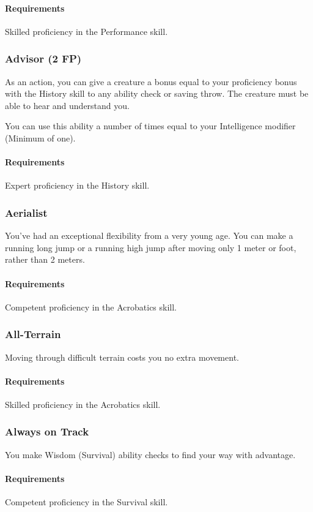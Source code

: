     \paragraph{Requirements} Skilled proficiency in the Performance skill.
\subsubsection{Advisor (2 FP)} \label{feat::advisor}
    As an action, you can give a creature a bonus equal to your proficiency bonus with the History skill to any ability check or saving throw.
    The creature must be able to hear and understand you.

    You can use this ability a number of times equal to your Intelligence modifier (Minimum of one).
    \paragraph{Requirements} Expert proficiency in the History skill.
\subsubsection{Aerialist} \label{feat::aerialist}
    You've had an exceptional flexibility from a very young age.
    You can make a running long jump or a running high jump after moving only 1 meter or foot, rather than 2 meters.
    \paragraph{Requirements} Competent proficiency in the Acrobatics skill.
\subsubsection{All-Terrain} \label{feat::allterrain}
    Moving through difficult terrain costs you no extra movement.
    \paragraph{Requirements} Skilled proficiency in the Acrobatics skill.
\subsubsection{Always on Track} \label{feat::alwaysontrack}
    You make Wisdom (Survival) ability checks to find your way with advantage.
    \paragraph{Requirements} Competent proficiency in the Survival skill.
